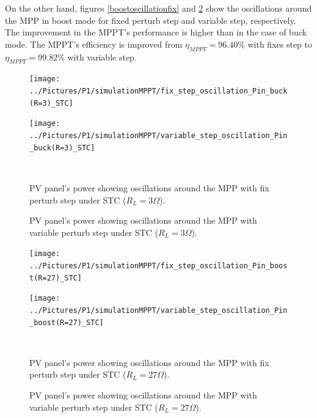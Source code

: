 On the other hand, figures \ref{boostoscillationfix} and \ref{boostoscillationvar} show the oscillations around the MPP in boost mode for fixed perturb step and variable step, respectively. The improvement in the MPPT's performance is higher than in the case of buck mode. The MPPT's efficiency is improved from $\eta_{MPPT} = 96.40\% $ with fixes step to $\eta_{MPPT} = 99.82\% $ with variable step. 

\begin{figure}[H]
	\begin{minipage}[c]{0.5\textwidth}
		\centering
		\texttt{[image: ../Pictures/P1/simulationMPPT/fix\_step\_oscillation\_Pin\_buck(R=3)\_STC]} %
	\end{minipage}%
	\hfill
	\begin{minipage}[c]{0.5\textwidth}
		\centering
		\texttt{[image: ../Pictures/P1/simulationMPPT/variable\_step\_oscillation\_Pin\_buck(R=3)\_STC]} %
	\end{minipage} \\ %
	\begin{minipage}[t]{0.45\textwidth}
		\caption{PV panel's power showing oscillations around the MPP with fix perturb step under STC ($R_{L}=3\Omega$).} %
		\label{buckoscillationfix}
	\end{minipage}%
	\hfill
	\begin{minipage}[t]{0.45\textwidth}
		\caption{PV panel's power showing oscillations around the MPP with variable perturb step under STC ($R_{L}=3\Omega$).} %
		\label{buckoscillationvar}
	\end{minipage}
\end{figure}


\vspace{1cm}
\begin{figure}[H]
	\begin{minipage}[c]{0.5\textwidth}
		\centering
		\texttt{[image: ../Pictures/P1/simulationMPPT/fix\_step\_oscillation\_Pin\_boost(R=27)\_STC]} %
	\end{minipage}%
	\hfill
	\begin{minipage}[c]{0.5\textwidth}
		\centering
		\texttt{[image: ../Pictures/P1/simulationMPPT/variable\_step\_oscillation\_Pin\_boost(R=27)\_STC]} %
	\end{minipage} \\ %
	\begin{minipage}[t]{0.45\textwidth}
		\caption{PV panel's power showing oscillations around the MPP with fix perturb step under STC ($R_{L}=27\Omega$).} %
		\label{boostoscillationfix}
	\end{minipage}%
	\hfill
	\begin{minipage}[t]{0.45\textwidth}
		\caption{PV panel's power showing oscillations around the MPP with variable perturb step under STC ($R_{L}=27\Omega$).} %
		\label{boostoscillationvar}
	\end{minipage}
\end{figure}

